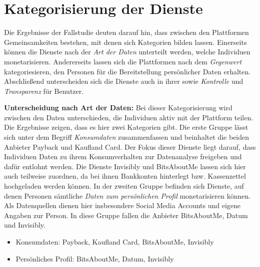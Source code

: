 \section{Kategorisierung der Dienste}
Die Ergebnisse der Fallstudie deuten darauf hin, dass zwischen den Plattformen Gemeinsamkeiten bestehen, mit denen sich Kategorien bilden lassen. Einerseits können die Dienste nach der \textit{Art der Daten} unterteilt werden, welche Individuen monetarisieren. Andererseits lassen sich die Plattformen nach dem \textit{Gegenwert} kategoriesieren, den Personen für die Bereitstellung persönlicher Daten erhalten. Abschließend unterscheiden sich die Dienste auch in ihrer  sowie \textit{Kontrolle} und \textit{Transparenz} für Benutzer. \newline

\noindent \textbf{Unterscheidung nach Art der Daten:} Bei dieser Kategorisierung wird zwischen den Daten unterschieden, die Individuen aktiv mit der Plattform teilen. Die Ergebnisse zeigen, dass es hier zwei Kategorien gibt. Die erste Gruppe lässt sich unter dem Begriff \textit{Konsumdaten} zusammenfassen und beinhaltet die beiden Anbieter Payback und Kaufland Card. Der Fokus dieser Dienste liegt darauf, dass Individuen Daten zu ihrem Konsumverhalten zur Datenanalyse freigeben und dafür entlohnt werden. Die Dienste Invisibly und BitsAboutMe lassen sich hier auch teilweise zuordnen, da bei ihnen Bankkonten hinterlegt bzw. Kassenzettel hochgeladen werden können. In der zweiten Gruppe befinden sich Dienste, auf denen Personen sämtliche \textit{Daten zum persönlichen Profil} monetarisieren können. Als Datenquellen dienen hier insbesondere Social Media Accounts und eigene Angaben zur Person. In diese Gruppe fallen die Anbieter BitsAboutMe, Datum und Invisibly.
\begin{itemize}
    \item Konsumdaten: Payback, Kaufland Card, BitsAboutMe, Invisibly
    \item Persönliches Profil: BitsAboutMe, Datum, Invisibly
\end{itemize}

